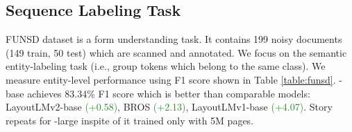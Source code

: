 \subsection{Sequence Labeling Task}
FUNSD \cite{jaume2019} dataset is a form understanding task. It contains 199 noisy documents (149 train, 50 test) which are scanned and annotated. We focus on the semantic entity-labeling task (i.e., group tokens which belong to the same class). 
We measure entity-level performance using F1 score shown in Table \ref{table:funsd}. \papertitle-base  achieves 83.34\% F1 score which is better than comparable models: LayoutLMv2-base \textcolor{forestgreen}{(+0.58)}, BROS \textcolor{forestgreen}{(+2.13)}, LayoutLMv1-base \textcolor{forestgreen}{(+4.07)}. Story repeats for \papertitle-large inspite of it trained only with 5M pages.

